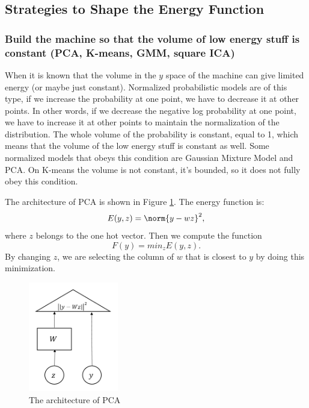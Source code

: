 \subsection{Strategies to Shape the Energy Function}

\subsubsection{Build the machine so that the volume of low energy stuff is constant (PCA, K-means, GMM, square ICA)}

When it is known that the volume in the $y$ space of the machine can give limited energy (or maybe just constant). 
Normalized probabilistic models are of this type, if we increase the probability at one point, we have to decrease it at other points.
In other words, if we decrease the negative log probability at one point, we have to increase it at other points to maintain the normalization of the distribution. 
The whole volume of the probability is constant, equal to 1, which means that the volume of the low energy stuff is constant as well. Some normalized models that obeys this condition are Gaussian Mixture Model and PCA. On K-means the volume is not constant, it's bounded, so it does not fully obey this condition. 

The architecture of PCA is shown in Figure \ref{figure2}. The energy function is:
\begin{equation}
E(y,z) =  \norm{y-wz}^2,
\end{equation}
where $z$ belongs to the one hot vector. Then we compute the function 
\begin{equation}
F(y) =  min_z E(y,z).
\end{equation}
By changing $z$, we are selecting the column of $w$ that is closest to $y$ by doing this minimization.

\begin{figure}[H]
    \centering
    \includegraphics[width=0.35\textwidth]{lectures/10-b/image/pic7.png}
    \caption{The architecture of PCA}
    \label{figure2}
\end{figure}


